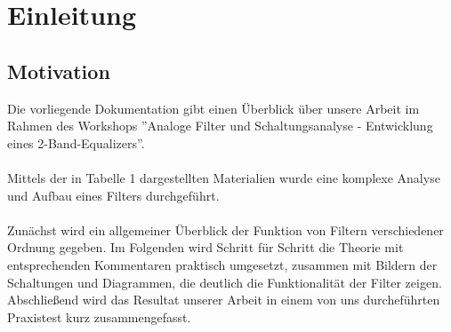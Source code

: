 \clearpage
\section{Einleitung}

\subsection{Motivation}
Die vorliegende Dokumentation gibt einen Überblick über unsere Arbeit im Rahmen des Workshops ”Analoge Filter und Schaltungsanalyse - Entwicklung eines 2-Band-Equalizers”.
\\
\\
Mittels der in Tabelle 1 dargestellten Materialien wurde eine komplexe Analyse und Aufbau eines Filters durchgeführt. 
\\
\\
Zunächst wird ein allgemeiner Überblick der Funktion von Filtern verschiedener Ordnung gegeben. Im Folgenden wird Schritt für Schritt die Theorie mit entsprechenden Kommentaren praktisch umgesetzt, zusammen mit Bildern der Schaltungen und Diagrammen, die
deutlich die Funktionalität der Filter zeigen. Abschließend wird das Resultat unserer Arbeit in einem von uns durcheführten Praxistest kurz zusammengefasst.

